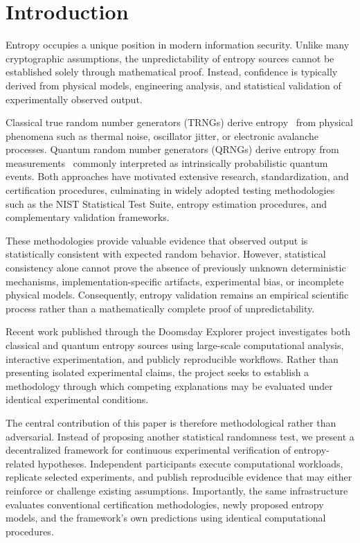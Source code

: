\documentclass[11pt]{article}
\begin{document}

\section{Introduction}

Entropy occupies a unique position in modern information security.
Unlike many cryptographic assumptions,
the unpredictability of entropy sources cannot be established solely
through mathematical proof.
Instead,
confidence is typically derived from
physical models,
engineering analysis,
and statistical validation of experimentally observed output.

Classical true random number generators (TRNGs)
derive entropy~\cite{shannon1949} from physical phenomena such as thermal noise,
oscillator jitter,
or electronic avalanche processes.
Quantum random number generators (QRNGs)
derive entropy from measurements~\cite{bell1964} commonly interpreted as
intrinsically probabilistic quantum events.
Both approaches have motivated extensive research,
standardization,
and certification procedures,
culminating in widely adopted testing methodologies such as
the NIST Statistical Test Suite,
entropy estimation procedures,
and complementary validation frameworks.

These methodologies provide valuable evidence that
observed output is statistically consistent with
expected random behavior.
However,
statistical consistency alone cannot prove the absence of
previously unknown deterministic mechanisms,
implementation-specific artifacts,
experimental bias,
or incomplete physical models.
Consequently,
entropy validation remains an empirical scientific process
rather than a mathematically complete proof of unpredictability.

Recent work published through the Doomsday Explorer project
investigates both classical and quantum entropy sources
using large-scale computational analysis,
interactive experimentation,
and publicly reproducible workflows.
Rather than presenting isolated experimental claims,
the project seeks to establish a methodology through which
competing explanations may be evaluated under identical
experimental conditions.

The central contribution of this paper is therefore
methodological rather than adversarial.
Instead of proposing another statistical randomness test,
we present a decentralized framework
for continuous experimental verification of entropy-related hypotheses.
Independent participants execute computational workloads,
replicate selected experiments,
and publish reproducible evidence that may either reinforce
or challenge existing assumptions.
Importantly,
the same infrastructure evaluates
conventional certification methodologies,
newly proposed entropy models,
and the framework's own predictions
using identical computational procedures.
\end{document}
